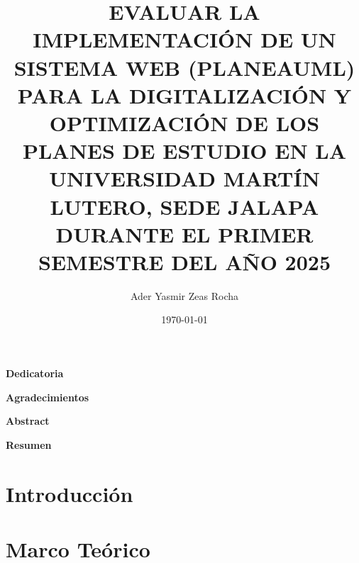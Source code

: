 \documentclass[12pt,letterpaper]{article}
\title{EVALUAR LA IMPLEMENTACIÓN DE UN SISTEMA WEB (PLANEAUML) PARA LA DIGITALIZACIÓN Y OPTIMIZACIÓN DE LOS PLANES DE ESTUDIO EN LA UNIVERSIDAD MARTÍN LUTERO, SEDE JALAPA DURANTE EL PRIMER SEMESTRE DEL AÑO 2025}
\author{Ader Yasmir Zeas Rocha}
\date{\today}
\begin{document}
	
	
	
	
	\clearpage
	\begin{center}\bfseries Dedicatoria \end{center}
	\vspace{1cm} %
	
	\clearpage
	\begin{center}\bfseries Agradecimientos \end{center}
	\vspace{1cm}
	
	\clearpage
	\begin{center}\bfseries Abstract \end{center}
	\vspace{1cm}
	
	\clearpage
	\begin{center}\bfseries Resumen \end{center}
	\vspace{1cm}
	
	\tableofcontents
	
	\setcounter{section}{0} 
	
	
	\clearpage
	\section{Introducción}
	
	
	\clearpage
	\section{Marco Teórico}
	
	
\end{document}
